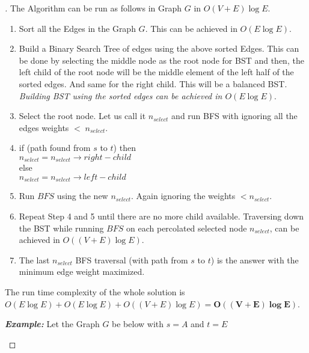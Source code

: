 \documentclass[a4paper, 12pt]{article}
\begin{document}
\begin{proof}[\color{red}{Solution}]
The Algorithm can be run as follows in Graph $G$ in $O(V + E)\log E$.
\begin{enumerate}
    \item Sort all the Edges in the Graph $G$. This can be achieved in $O(E \log E)$.
    \item Build a Binary Search Tree of edges using the above  sorted Edges. This can be done by selecting the middle node as the root node for BST and then, the left child of the root node will be the middle element of the left half of the sorted edges. And same for the right child. This will be a balanced BST. \textit{Building BST using the sorted edges can be achieved in $O(E \log E)$}.
    \item Select the root node. Let us call it $n_{select}$ and run BFS with ignoring all the edges weights $< \; n_{select}$.
    \item \; if (path found from $s$ to $t$) then \\ 
    \hspace*{2em} $n_{select} = n_{select}\to right-child$ \\
    \hspace*{0em} else \\
    \hspace*{2em} $n_{select} = n_{select}\to left-child$ \\
    \item Run $BFS$ using the new $n_{select}$. Again ignoring the weights $< n_{select}$. 
    \item Repeat Step 4 and 5 until there are no more child available. Traversing down the BST while running $BFS$ on each percolated selected node $n_{select}$, can be achieved in $O((V + E) \log E)$.
    \item The last $n_{select}$ BFS traversal (with path from $s$ to $t$) is the answer with the minimum edge weight maximized. 
\end{enumerate}

The run time complexity of the whole solution is $O(E \log E) + O(E \log E) + O((V + E) \log E) = \bm{O((V + E) \log E)}$.
\bigskip

\textbf{\textit{Example: }}
Let the Graph $G$ be below with $s = A$ and $t = E$
\bigskip
\begin{center}
\end{center}
\end{proof}
\end{document}
